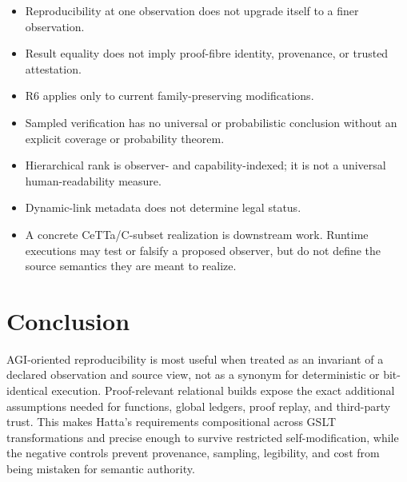 \documentclass[11pt]{article}
\begin{document}
\begin{itemize}
  \item Reproducibility at one observation does not upgrade itself to a finer
        observation.
  \item Result equality does not imply proof-fibre identity, provenance, or
        trusted attestation.
  \item R6 applies only to current family-preserving modifications.
  \item Sampled verification has no universal or probabilistic conclusion
        without an explicit coverage or probability theorem.
  \item Hierarchical rank is observer- and capability-indexed; it is not a
        universal human-readability measure.
  \item Dynamic-link metadata does not determine legal status.
  \item A concrete CeTTa/C-subset realization is downstream work.  Runtime
        executions may test or falsify a proposed observer, but do not define
        the source semantics they are meant to realize.
\end{itemize}

\section{Conclusion}

AGI-oriented reproducibility is most useful when treated as an invariant of a
declared observation and source view, not as a synonym for deterministic or
bit-identical execution.  Proof-relevant relational builds expose the exact
additional assumptions needed for functions, global ledgers, proof replay,
and third-party trust.  This makes Hatta's requirements compositional across
GSLT transformations and precise enough to survive restricted
self-modification, while the negative controls prevent provenance, sampling,
legibility, and cost from being mistaken for semantic authority.
\end{document}
